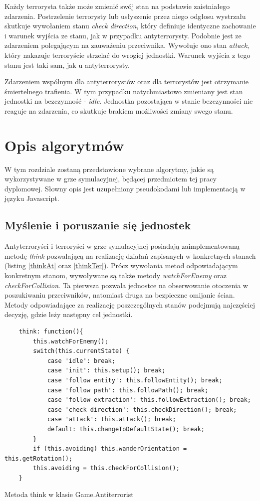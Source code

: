 Każdy terrorysta także może zmienić swój stan na podstawie zaistniałego zdarzenia. Postrzelenie terrorysty lub usłyszenie przez niego odgłosu wystrzału skutkuje wywołaniem stanu \emph{check direction}, który definiuje identyczne zachowanie i warunek wyjścia ze stanu, jak w przypadku antyterrorysty. Podobnie jest ze zdarzeniem polegającym na zauważeniu przeciwnika. Wywołuje ono stan \emph{attack}, który nakazuje terroryście strzelać do wrogiej jednostki. Warunek wyjścia z tego stanu jest taki sam, jak u antyterrorysty.

Zdarzeniem wspólnym dla antyterrorystów oraz dla terrorystów jest otrzymanie śmiertelnego trafienia. W tym przypadku natychmiastowo zmieniany jest stan jednostki na bezczynność - \emph{idle}. Jednostka pozostająca w stanie bezczynności nie reaguje na zdarzenia, co skutkuje brakiem możliwości zmiany swego stanu.

\section{Opis algorytmów}
W tym rozdziale zostaną przedstawione wybrane algorytmy, jakie są wykorzystywane w grze symulacyjnej, będącej przedmiotem tej pracy dyplomowej. Słowny opis jest uzupełniony pseudokodami lub implementacją w języku Javascript.

\subsection{Myślenie i poruszanie się jednostek}
Antyterroryści i terroryści w grze symulacyjnej posiadają zaimplementowaną metodę \emph{think} pozwalającą na realizację działań zapisanych w konkretnych stanach (listing \ref{thinkAt} oraz \ref{thinkTer}). Prócz wywołania metod odpowiadającym konkretnym stanom, wywoływane są także metody \emph{watchForEnemy} oraz \emph{checkForCollision}. Ta pierwsza pozwala jednostce na obserwowanie otoczenia w poszukiwaniu przeciwników, natomiast druga na bezpieczne omijanie ścian. Metody odpowiadające za realizację poszczególnych stanów podejmują najczęściej decyzję, gdzie leży następny cel jednostki.

\begin{table}
\begin{center}
\begin{lstlisting}
    think: function(){
        this.watchForEnemy();
        switch(this.currentState) {
            case 'idle': break;
            case 'init': this.setup(); break;
            case 'follow entity': this.followEntity(); break;
            case 'follow path': this.followPath(); break;
            case 'follow extraction': this.followExtraction(); break;
            case 'check direction': this.checkDirection(); break;
            case 'attack': this.attack(); break;
            default: this.changeToDefaultState(); break;
        }
        if (this.avoiding) this.wanderOrientation = this.getRotation();
        this.avoiding = this.checkForCollision();
    }
 \end{lstlisting}
\caption {Metoda think w klasie Game.Antiterrorist}
\label{thinkAt}
\end{center}
\end{table}

